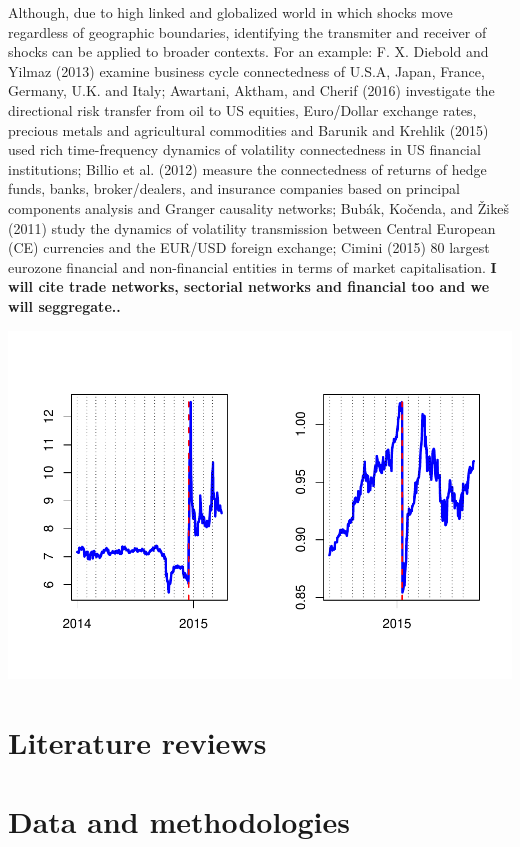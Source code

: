 \documentclass[]{elsarticle} %
\makeatletter
\def\maxwidth{\ifdim\Gin@nat@width>\linewidth\linewidth
\else\Gin@nat@width\fi}
\let\Oldincludegraphics\includegraphics
\renewcommand{\includegraphics}[1]{\Oldincludegraphics[width=\maxwidth]{#1}}
\makeatother
\begin{document}
Although, due to high linked and globalized world in which shocks move
regardless of geographic boundaries, identifying the transmiter and
receiver of shocks can be applied to broader contexts. For an example:
F. X. Diebold and Yilmaz (2013) examine business cycle connectedness of
U.S.A, Japan, France, Germany, U.K. and Italy; Awartani, Aktham, and
Cherif (2016) investigate the directional risk transfer from oil to US
equities, Euro/Dollar exchange rates, precious metals and agricultural
commodities and Barunik and Krehlik (2015) used rich time-frequency
dynamics of volatility connectedness in US financial institutions;
Billio et al. (2012) measure the connectedness of returns of hedge
funds, banks, broker/dealers, and insurance companies based on principal
components analysis and Granger causality networks; Bubák, Kočenda, and
Žikeš (2011) study the dynamics of volatility transmission between
Central European (CE) currencies and the EUR/USD foreign exchange;
Cimini (2015) 80 largest eurozone financial and non-financial entities
in terms of market capitalisation. \textbf{I will cite trade networks,
sectorial networks and financial too and we will seggregate..}

\includegraphics{Main_files/figure-latex/unnamed-chunk-1-1.pdf}

\section{Literature reviews}\label{literature-reviews}

\section{Data and methodologies}\label{data-and-methodologies}
\end{document}
